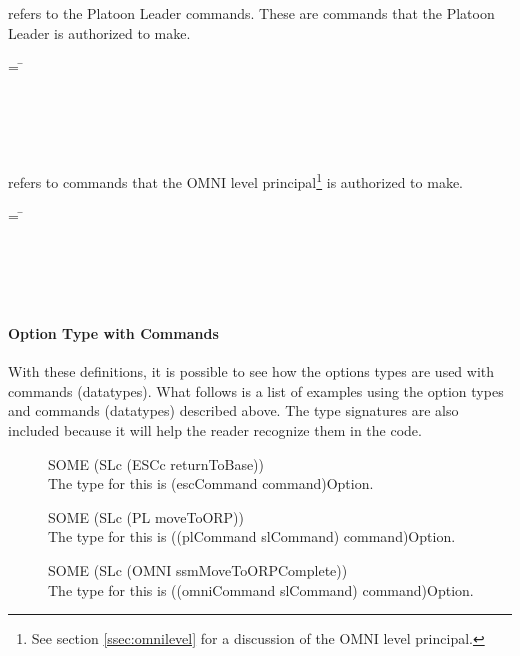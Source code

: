 \documentclass[../../main/main.tex]{subfiles}
\begin{document}
 refers to the Platoon Leader commands.  These are commands that the Platoon Leader is authorized to make.  

\begin{tabbing}
 = \=  \\
					     \>\HOLTokenBar{}  \\
					     \>\HOLTokenBar{}  \\
					     \>\HOLTokenBar{} \\
         				     \> \HOLTokenBar{}  \\
				             \> \HOLTokenBar{} 
\end{tabbing}


 refers to commands that the OMNI level principal\footnote{See section \ref{ssec:omnilevel} for a discussion of the OMNI level principal.} is authorized to make. 

\begin{tabbing}
 = \=  \\
						 \> \HOLTokenBar{} \\
 				       	 	 \> \HOLTokenBar{}  \\
						 \> \HOLTokenBar{} \\
            					 \> \HOLTokenBar{} \\
					 	 \> \HOLTokenBar{} 
\end{tabbing}          
          
          
\paragraph*{Option Type with Commands}
With these definitions, it is possible to see how the options types are used with commands (datatypes).  What follows is a list of examples using the option types and commands (datatypes) described above.  The type signatures are also included because it will help the reader recognize them in the  code.
\begin{description}
\item[ ] SOME (SLc (ESCc returnToBase)) \\
The type for this is (escCommand command)Option.
\item[ ] SOME (SLc (PL moveToORP))  \\
The type for this is ((plCommand slCommand) command)Option.  
\item[ ] SOME (SLc (OMNI ssmMoveToORPComplete))\\
The type for this is ((omniCommand slCommand) command)Option.  
\end{description}
\end{document}
